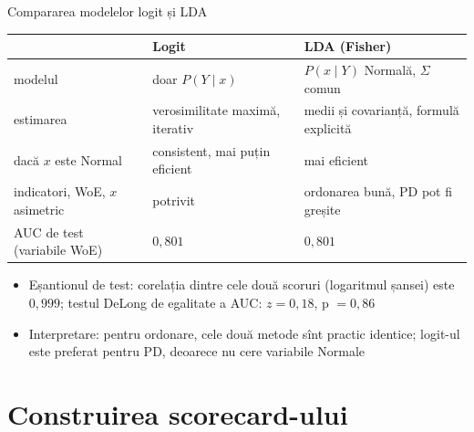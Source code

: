 \begin{frame}{Compararea modelelor logit și LDA}
\itemsize{\footnotesize}
\begin{center}
\scriptsize
\begin{tabular}{p{3.0cm}p{3.9cm}p{3.9cm}}
\toprule
& \textbf{Logit} & \textbf{LDA (Fisher)} \\
\midrule
modelul & doar $P(Y \mid x)$ & $P(x \mid Y)$ Normală, $\Sigma$ comun \\
estimarea & verosimilitate maximă, iterativ & medii și covarianță, formulă explicită \\
dacă $x$ este Normal & consistent, mai puțin eficient & mai eficient \\
indicatori, WoE, $x$ asimetric & potrivit & ordonarea bună, PD pot fi greșite \\
AUC de test (variabile WoE) & $0{,}801$ & $0{,}801$ \\
\bottomrule
\end{tabular}
\end{center}
\begin{itemize}
    \item Eșantionul de test: corelația dintre cele două scoruri (logaritmul șansei) este $0{,}999$; testul DeLong de egalitate a AUC: $z = 0{,}18$, p $= 0{,}86$ 
    \item Interpretare: pentru ordonare, cele două metode sînt practic identice; logit-ul este preferat pentru PD, deoarece nu cere variabile Normale
\end{itemize}
\end{frame}


\section{Construirea scorecard-ului}

